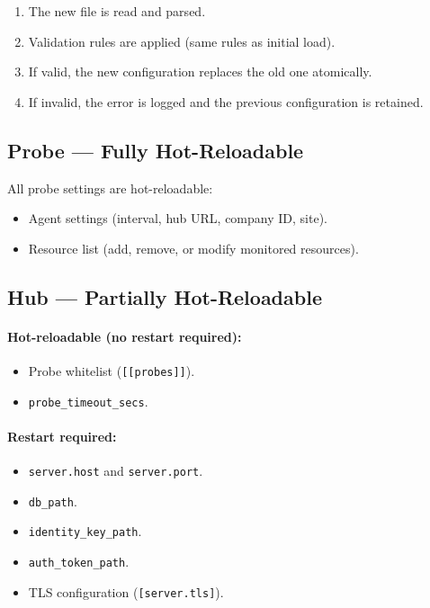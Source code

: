 \documentclass[12pt]{report}
\begin{document}
\begin{enumerate}
    \item The new file is read and parsed.
    \item Validation rules are applied (same rules as initial load).
    \item If valid, the new configuration replaces the old one atomically.
    \item If invalid, the error is logged and the previous configuration is
          retained.
\end{enumerate}

\subsection{Probe --- Fully Hot-Reloadable}

All probe settings are hot-reloadable:

\begin{itemize}
    \item Agent settings (interval, hub URL, company ID, site).
    \item Resource list (add, remove, or modify monitored resources).
\end{itemize}

\subsection{Hub --- Partially Hot-Reloadable}

\paragraph{Hot-reloadable (no restart required):}

\begin{itemize}
    \item Probe whitelist (\texttt{[[probes]]}).
    \item \texttt{probe\_timeout\_secs}.
\end{itemize}

\paragraph{Restart required:}

\begin{itemize}
    \item \texttt{server.host} and \texttt{server.port}.
    \item \texttt{db\_path}.
    \item \texttt{identity\_key\_path}.
    \item \texttt{auth\_token\_path}.
    \item TLS configuration (\texttt{[server.tls]}).
\end{itemize}
\end{document}
